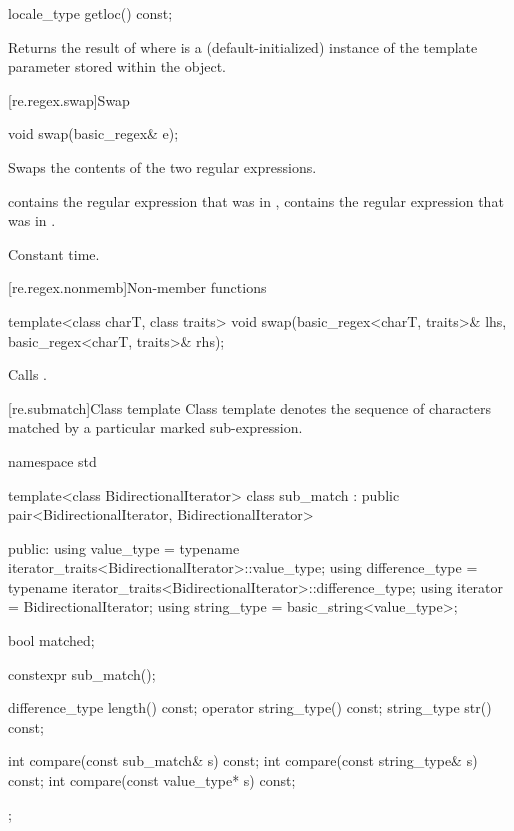 %
\begin{itemdecl}
locale_type getloc() const;
\end{itemdecl}

\begin{itemdescr}
\pnum
\effects
Returns the result of  where
 is a (default-initialized) instance of the template
parameter  stored within the object.
\end{itemdescr}

[re.regex.swap]{Swap}
%

%
\begin{itemdecl}
void swap(basic_regex& e);
\end{itemdecl}

\begin{itemdescr}
\pnum
\effects
Swaps the contents of the two regular expressions.

\pnum
\ensures
{} contains the regular expression
that was in ,  contains the regular expression that
was in .

\pnum
\complexity
Constant time.
\end{itemdescr}

[re.regex.nonmemb]{Non-member functions}

%
\begin{itemdecl}
template<class charT, class traits>
  void swap(basic_regex<charT, traits>& lhs, basic_regex<charT, traits>& rhs);
\end{itemdecl}

\begin{itemdescr}
\pnum
\effects
Calls .
\end{itemdescr}

[re.submatch]{Class template }
\pnum
{}%
Class template  denotes the sequence of characters matched
by a particular marked sub-expression.

\begin{codeblock}
namespace std {
  template<class BidirectionalIterator>
    class sub_match : public pair<BidirectionalIterator, BidirectionalIterator> {
    public:
      using value_type      =
              typename iterator_traits<BidirectionalIterator>::value_type;
      using difference_type =
              typename iterator_traits<BidirectionalIterator>::difference_type;
      using iterator        = BidirectionalIterator;
      using string_type     = basic_string<value_type>;

      bool matched;

      constexpr sub_match();

      difference_type length() const;
      operator string_type() const;
      string_type str() const;

      int compare(const sub_match& s) const;
      int compare(const string_type& s) const;
      int compare(const value_type* s) const;
    };
}
\end{codeblock}


